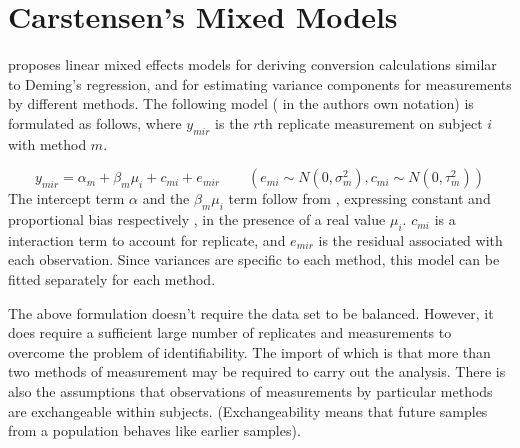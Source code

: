 \documentclass{report}
\begin{document}
	
	
	\section{Carstensen's Mixed Models}
	
	\citet{BXC2004} proposes linear mixed effects models for deriving
	conversion calculations similar to Deming's regression, and for
	estimating variance components for measurements by different
	methods. The following model ( in the authors own notation) is
	formulated as follows, where $y_{mir}$ is the $r$th replicate
	measurement on subject $i$ with method $m$.
	
	\begin{equation}
	y_{mir}  = \alpha_{m} + \beta_{m}\mu_{i} + c_{mi} + e_{mir} \qquad
	( e_{mi} \sim N(0,\sigma^{2}_{m}), c_{mi} \sim N(0,\tau^{2}_{m}))
	\end{equation}
	The intercept term $\alpha$ and the $\beta_{m}\mu_{i}$ term follow
	from \citet{DunnSEME}, expressing constant and proportional bias
	respectively , in the presence of a real value $\mu_{i}.$
	$c_{mi}$ is a interaction term to account for replicate, and
	$e_{mir}$ is the residual associated with each observation.
	Since variances are specific to each method, this model can be
	fitted separately for each method.
	
	The above formulation doesn't require the data set to be balanced.
	However, it does require a sufficient large number of replicates
	and measurements to overcome the problem of identifiability. The
	import of which is that more than two methods of measurement may
	be required to carry out the analysis. There is also the
	assumptions that observations of measurements by particular
	methods are exchangeable within subjects. (Exchangeability means
	that future samples from a population behaves like earlier
	samples).
	
\end{document}
